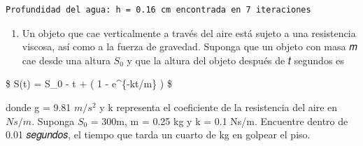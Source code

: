 \documentclass[
  english,
  letterpaper,
  DIV=11,
  numbers=noendperiod]{scrartcl}
\providecommand{\tightlist}{%
  \setlength{\itemsep}{0pt}\setlength{\parskip}{0pt}}
\begin{document}
\begin{verbatim}
Profundidad del agua: h = 0.16 cm encontrada en 7 iteraciones
\end{verbatim}

\begin{enumerate}
\def\labelenumi{\arabic{enumi}.}
\setcounter{enumi}{1}
\tightlist
\item
  Un objeto que cae verticalmente a través del aire está sujeto a una
  resistencia viscosa, así como a la fuerza de gravedad. Suponga que un
  objeto con masa 𝑚 cae desde una altura \(S_0\) y que la altura del
  objeto después de 𝑡 segundos es
\end{enumerate}

\$ S(t) = S\_0 -  t +  ( 1 -
e\^{}\{-kt/m\} ) \$

donde g = 9.81 \(m/s^{2}\) y k representa el coeficiente de la
resistencia del aire en \(Ns/m\). Suponga \(S_0\) = 300m, m = 0.25 kg y
k = 0.1 Ns/m. Encuentre dentro de 0.01 𝑠𝑒𝑔𝑢𝑛𝑑𝑜𝑠, el tiempo que tarda un
cuarto de kg en golpear el piso.
\end{document}
